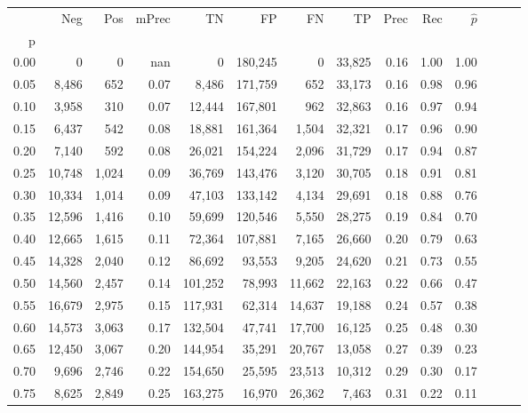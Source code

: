 \begin{tabular}{rrrrrrrrrrrrrr}
\toprule
{} &     Neg &    Pos & mPrec &       TN &       FP &      FN &      TP &  Prec &   Rec & $\hat{p}$ \\
p    &         &        &       &          &          &         &         &       &       &           \\
\midrule
0.00 &       0 &      0 &   nan &        0 &  180,245 &       0 &  33,825 &  0.16 &  1.00 &      1.00 \\
0.05 &   8,486 &    652 &  0.07 &    8,486 &  171,759 &     652 &  33,173 &  0.16 &  0.98 &      0.96 \\
0.10 &   3,958 &    310 &  0.07 &   12,444 &  167,801 &     962 &  32,863 &  0.16 &  0.97 &      0.94 \\
0.15 &   6,437 &    542 &  0.08 &   18,881 &  161,364 &   1,504 &  32,321 &  0.17 &  0.96 &      0.90 \\
0.20 &   7,140 &    592 &  0.08 &   26,021 &  154,224 &   2,096 &  31,729 &  0.17 &  0.94 &      0.87 \\
0.25 &  10,748 &  1,024 &  0.09 &   36,769 &  143,476 &   3,120 &  30,705 &  0.18 &  0.91 &      0.81 \\
0.30 &  10,334 &  1,014 &  0.09 &   47,103 &  133,142 &   4,134 &  29,691 &  0.18 &  0.88 &      0.76 \\
0.35 &  12,596 &  1,416 &  0.10 &   59,699 &  120,546 &   5,550 &  28,275 &  0.19 &  0.84 &      0.70 \\
0.40 &  12,665 &  1,615 &  0.11 &   72,364 &  107,881 &   7,165 &  26,660 &  0.20 &  0.79 &      0.63 \\
0.45 &  14,328 &  2,040 &  0.12 &   86,692 &   93,553 &   9,205 &  24,620 &  0.21 &  0.73 &      0.55 \\
0.50 &  14,560 &  2,457 &  0.14 &  101,252 &   78,993 &  11,662 &  22,163 &  0.22 &  0.66 &      0.47 \\
0.55 &  16,679 &  2,975 &  0.15 &  117,931 &   62,314 &  14,637 &  19,188 &  0.24 &  0.57 &      0.38 \\
0.60 &  14,573 &  3,063 &  0.17 &  132,504 &   47,741 &  17,700 &  16,125 &  0.25 &  0.48 &      0.30 \\
0.65 &  12,450 &  3,067 &  0.20 &  144,954 &   35,291 &  20,767 &  13,058 &  0.27 &  0.39 &      0.23 \\
0.70 &   9,696 &  2,746 &  0.22 &  154,650 &   25,595 &  23,513 &  10,312 &  0.29 &  0.30 &      0.17 \\
0.75 &   8,625 &  2,849 &  0.25 &  163,275 &   16,970 &  26,362 &   7,463 &  0.31 &  0.22 &      0.11 \\

\end{tabular}
